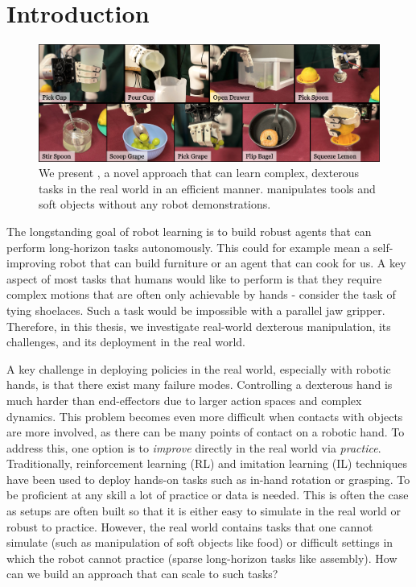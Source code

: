 \chapter{Introduction}
\label{sec:intro}

\begin{figure}[H]
\centering
\includegraphics[width=\linewidth]{figs/teaser.pdf}
\vspace{-0.2in}
  \caption{\small We present \ours, a novel approach that can learn complex, dexterous tasks in the real world in an efficient manner. \ours manipulates tools and soft objects without any robot demonstrations.}
 \label{fig:teaser}
\end{figure}


The longstanding goal of robot learning is to build robust agents that can perform long-horizon tasks autonomously. This could for example mean a self-improving robot that can build furniture or an agent that can cook for us. A key aspect of most tasks that humans would like to perform is that they require complex motions that are often only achievable by hands - consider the task of tying shoelaces. Such a task would be impossible with a parallel jaw gripper. Therefore, in this thesis, we investigate real-world dexterous manipulation, its challenges, and its deployment in the real world. 

A key challenge in deploying  policies in the real world, especially with robotic hands, is that there exist many failure modes. Controlling a dexterous hand is much harder than end-effectors due to larger action spaces and complex dynamics. This problem becomes even more difficult when contacts with objects are more involved, as there can be many points of contact on a robotic hand. To address this, one option is to \textit{improve} directly in the real world via \textit{practice}. Traditionally, reinforcement learning (RL) and imitation learning (IL) techniques have been used to deploy hands-on tasks such as in-hand rotation or grasping. To be proficient at any skill a lot of practice or data is needed. This is often the case as setups are often built so that it is either easy to simulate in the real world or robust to practice. However, the real world contains tasks that one cannot simulate (such as manipulation of soft objects like food) or difficult settings in which the robot cannot practice (sparse long-horizon tasks like assembly). How can we build an approach that can scale to such tasks? 

